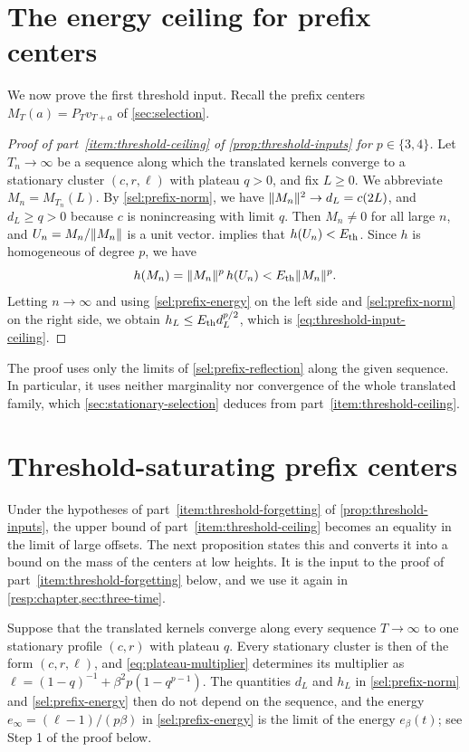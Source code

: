 \section{The energy ceiling for prefix centers}\label{sec:tree-input-ceiling}

We now prove the first threshold input. Recall the prefix centers $M_T(a)=P_Tv_{T+a}$ of \cref{sec:selection}.

\begin{proof}[Proof of part~\ref{item:threshold-ceiling} of \cref{prop:threshold-inputs} for $p\in\{3,4\}$]
Let $T_n\to\infty$ be a sequence along which the translated kernels converge to a stationary cluster $(c,r,\ell)$ with plateau $q>0$, and fix $L\ge0$. We abbreviate $M_n=M_{T_n}(L)$. By \eqref{sel:prefix-norm}, we have $\lVert M_n\rVert^2\to d_L=c(2L)$, and $d_L\ge q>0$ because $c$ is nonincreasing with limit $q$. Then $M_n\ne0$ for all large $n$, and $U_n=M_n/\lVert M_n\rVert$ is a unit vector.  implies that $h(U_n)<E_{\mathrm{th}}$. Since $h$ is homogeneous of degree $p$, we have
\[
 h(M_n)=\lVert M_n\rVert^p\,h(U_n)<E_{\mathrm{th}}\lVert M_n\rVert^p.
\]
Letting $n\to\infty$ and using \eqref{sel:prefix-energy} on the left side and \eqref{sel:prefix-norm} on the right side, we obtain $h_L\le E_{\mathrm{th}} d_L^{p/2}$, which is \eqref{eq:threshold-input-ceiling}.
\end{proof}

The proof uses only the limits of \cref{sel:prefix-reflection} along the given sequence. In particular, it uses neither marginality nor convergence of the whole translated family, which \cref{sec:stationary-selection} deduces from part~\ref{item:threshold-ceiling}.

\section{Threshold-saturating prefix centers}\label{sec:tree-saturated-centers}

Under the hypotheses of part~\ref{item:threshold-forgetting} of \cref{prop:threshold-inputs}, the upper bound of part~\ref{item:threshold-ceiling} becomes an equality in the limit of large offsets. The next proposition states this and converts it into a bound on the mass of the centers at low heights. It is the input to the proof of part~\ref{item:threshold-forgetting} below, and we use it again in \cref{resp:chapter,sec:three-time}.

Suppose that the translated kernels converge along every sequence $T\to\infty$ to one stationary profile $(c,r)$ with plateau $q$. Every stationary cluster is then of the form $(c,r,\ell)$, and \eqref{eq:plateau-multiplier} determines its multiplier as $\ell=(1-q)^{-1}+\beta^2p(1-q^{p-1})$. The quantities $d_L$ and $h_L$ in \eqref{sel:prefix-norm} and \eqref{sel:prefix-energy} then do not depend on the sequence, and the energy $e_\infty=(\ell-1)/(p\beta)$ in \eqref{sel:prefix-energy} is the limit of the energy $e_\beta(t)$; see Step 1 of the proof below.

